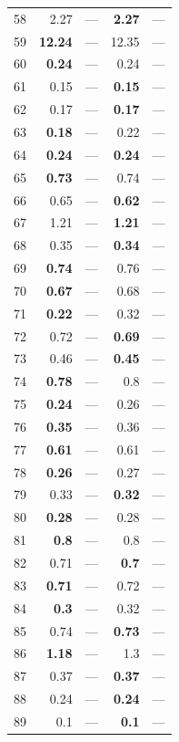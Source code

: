 \begin{longtable}{lr@{\hskip 4pt}l@{\hskip 12pt}r@{\hskip 4pt}l@{\hskip 12pt}}
58 & 2.27 & --- & \textbf{2.27} & --- \\
59 & \textbf{12.24} & --- & 12.35 & --- \\
\midrule
60 & \textbf{0.24} & --- & 0.24 & --- \\
61 & 0.15 & --- & \textbf{0.15} & --- \\
62 & 0.17 & --- & \textbf{0.17} & --- \\
63 & \textbf{0.18} & --- & 0.22 & --- \\
64 & \textbf{0.24} & --- & \textbf{0.24} & --- \\
65 & \textbf{0.73} & --- & 0.74 & --- \\
66 & 0.65 & --- & \textbf{0.62} & --- \\
67 & 1.21 & --- & \textbf{1.21} & --- \\
68 & 0.35 & --- & \textbf{0.34} & --- \\
69 & \textbf{0.74} & --- & 0.76 & --- \\
70 & \textbf{0.67} & --- & 0.68 & --- \\
71 & \textbf{0.22} & --- & 0.32 & --- \\
72 & 0.72 & --- & \textbf{0.69} & --- \\
73 & 0.46 & --- & \textbf{0.45} & --- \\
74 & \textbf{0.78} & --- & 0.8 & --- \\
75 & \textbf{0.24} & --- & 0.26 & --- \\
76 & \textbf{0.35} & --- & 0.36 & --- \\
77 & \textbf{0.61} & --- & 0.61 & --- \\
78 & \textbf{0.26} & --- & 0.27 & --- \\
79 & 0.33 & --- & \textbf{0.32} & --- \\
80 & \textbf{0.28} & --- & 0.28 & --- \\
81 & \textbf{0.8} & --- & 0.8 & --- \\
82 & 0.71 & --- & \textbf{0.7} & --- \\
83 & \textbf{0.71} & --- & 0.72 & --- \\
84 & \textbf{0.3} & --- & 0.32 & --- \\
85 & 0.74 & --- & \textbf{0.73} & --- \\
86 & \textbf{1.18} & --- & 1.3 & --- \\
87 & 0.37 & --- & \textbf{0.37} & --- \\
88 & 0.24 & --- & \textbf{0.24} & --- \\
89 & 0.1 & --- & \textbf{0.1} & --- \\

\end{longtable}
